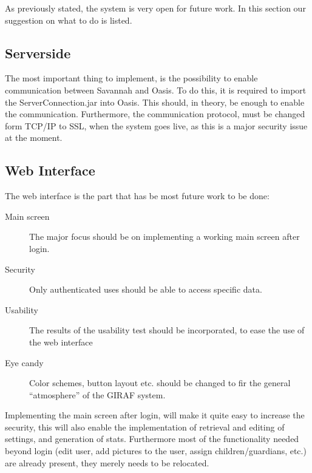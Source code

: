 As previously stated, the system is very open for future work. In this section our suggestion on what to do is listed.

\subsection*{Serverside}
The most important thing to implement, is the possibility to enable communication between Savannah and Oasis. To do this, it is required to import the ServerConnection.jar into Oasis. This should, in theory, be enough to enable the communication. Furthermore, the communication protocol, must be changed form TCP/IP to SSL, when the system goes live, as this is a major security issue at the moment.

\subsection*{Web Interface}
The web interface is the part that has be most future work to be done:
\begin{description}
	\item[Main screen] The major focus should be on implementing a working main screen after login.
	\item[Security] Only authenticated uses should be able to access specific data.
	\item[Usability] The results of the usability test should be incorporated, to ease the use of the web interface
	\item[Eye candy] Color schemes, button layout etc. should be changed to fir the general ``atmosphere'' of the GIRAF system.
\end{description}
Implementing the main screen after login, will make it quite easy to increase the security, this will also enable the implementation of retrieval and editing of settings, and generation of stats. Furthermore most of the functionality needed beyond login (edit user, add pictures to the user, assign children/guardians, etc.) are already present, they merely needs to be relocated.